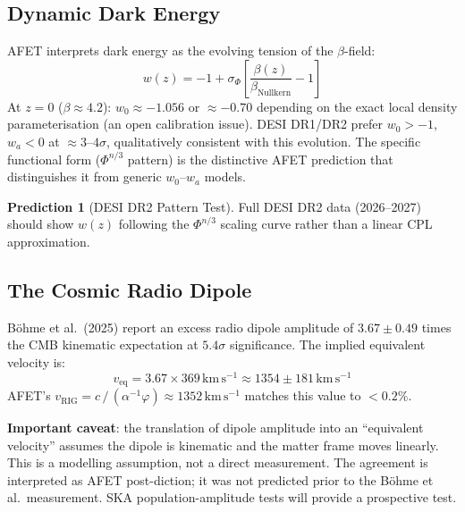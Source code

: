 \documentclass[12pt,a4paper]{article}
\theoremstyle{definition}
\newtheorem{prediction}{Prediction}
\newcommand{\betanull}{\beta_{\mathrm{Nullkern}}}
\newcommand{\sigphi}{\sigma_{\Phi}}
\newcommand{\vrig}{v_{\mathrm{RIG}}}
\newcommand{\phigold}{\varphi}   %
\newcommand{\PhiAFET}{\Phi}      %
\begin{document}
\subsection{Dynamic Dark Energy}

\begin{hypothesis}
AFET interprets dark energy as the evolving tension of the $\beta$-field:
\begin{equation}
  w(z) = -1 + \sigphi\left[\frac{\beta(z)}{\betanull} - 1\right]
\end{equation}
At $z=0$ ($\beta \approx 4.2$): $w_0 \approx -1.056$ or $\approx -0.70$ depending
on the exact local density parameterisation (an open calibration issue).
DESI DR1/DR2 prefer $w_0 > -1$, $w_a < 0$ at $\approx 3$--$4\sigma$,
qualitatively consistent with this evolution.
The specific functional form ($\PhiAFET^{n/3}$ pattern) is the distinctive AFET
prediction that distinguishes it from generic $w_0$--$w_a$ models.
\end{hypothesis}

\begin{prediction}[DESI DR2 Pattern Test]
Full DESI DR2 data (2026--2027) should show $w(z)$ following the $\PhiAFET^{n/3}$
scaling curve rather than a linear CPL approximation.
\end{prediction}

\subsection{The Cosmic Radio Dipole}

\begin{validated}
Böhme et al.\ (2025) report an excess radio dipole amplitude of
$3.67 \pm 0.49$ times the CMB kinematic expectation at $5.4\sigma$ significance.
The implied equivalent velocity is:
\[
  v_{\mathrm{eq}} = 3.67 \times 369\,\mathrm{km\,s^{-1}} \approx 1354\pm181\,\mathrm{km\,s^{-1}}
\]
AFET's $\vrig = c\,/\,(\alpha^{-1}\phigold) \approx 1352\,\mathrm{km\,s^{-1}}$
matches this value to $<0.2\%$.

\textbf{Important caveat}: the translation of dipole amplitude into an ``equivalent
velocity'' assumes the dipole is kinematic and the matter frame moves linearly.
This is a modelling assumption, not a direct measurement.
The agreement is interpreted as AFET post-diction; it was not predicted prior to
the Böhme et al.\ measurement. SKA population-amplitude tests will provide
a prospective test.
\end{validated}
\end{document}
